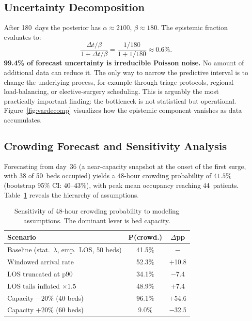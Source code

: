 \documentclass[10pt, twocolumn]{article}
\begin{document}
\subsection{Uncertainty Decomposition}

After 180~days the posterior has $\alpha \approx 2100$,
$\beta \approx 180$. The epistemic fraction evaluates to:
\[
    \frac{\Delta t/\beta}{1 + \Delta t/\beta}
    = \frac{1/180}{1 + 1/180}
    \approx 0.6\%.
\]
\textbf{99.4\% of forecast uncertainty is irreducible Poisson noise.}
No amount of additional data can reduce it. The only way to narrow the
predictive interval is to change the underlying process, for example
through triage protocols, regional load-balancing, or elective-surgery
scheduling. This is arguably the most practically important finding:
the bottleneck is not statistical but operational.
Figure~\ref{fig:vardecomp} visualizes how the epistemic component
vanishes as data accumulates.

\subsection{Crowding Forecast and Sensitivity Analysis}

Forecasting from day~36 (a near-capacity snapshot at the onset of the
first surge, with 38 of 50~beds occupied) yields a 48-hour crowding
probability of $\mathbf{41.5\%}$ (bootstrap 95\% CI: 40--43\%), with
peak mean occupancy reaching 44~patients.
Table~\ref{tab:sensitivity} reveals the hierarchy of assumptions.

\begin{table}[H]
\centering
\small
\caption{Sensitivity of 48-hour crowding probability to modeling
assumptions. The dominant lever is bed capacity.}
\label{tab:sensitivity}
\renewcommand{\arraystretch}{1.2}
\begin{tabular}{@{}lcc@{}}
\toprule
\textbf{Scenario} & \textbf{P(crowd.)} & \boldmath$\Delta$\textbf{pp} \\
\midrule
Baseline (stat.\ $\lambda$, emp.\ LOS, 50 beds)
                          & 41.5\% & $-$     \\
Windowed arrival rate     & 52.3\% & $+$10.8  \\
LOS truncated at p90      & 34.1\% & $-$7.4   \\
LOS tails inflated $\times 1.5$ & 48.9\% & $+$7.4   \\
Capacity $-20\%$ (40 beds)& 96.1\% & $+$54.6  \\
Capacity $+20\%$ (60 beds)& 9.0\%  & $-$32.5  \\
\bottomrule
\end{tabular}
\end{table}
\end{document}

